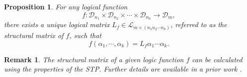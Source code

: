 \documentclass[11pt,onecolumn]{article}
\newtheorem{proposition}{Proposition}
\newtheorem{remark}{Remark}
\newcommand{\ddelta}{{\boldsymbol\delta}}
\begin{document}
	
	
	\begin{proposition}\cite{cheng2011analysis}\label{TheoremCheng} For any logical function
		\[f:\mathscr D_{n_1}\times\mathscr D_{n_2}\times\cdots\times\mathscr D_{n_k}\rightarrow\mathscr D_m,\] there exists a unique logical matrix $L_f\in\mathscr L_{m\times (n_1n_2\cdots n_k)}$, referred to as the structural matrix of $f$, such that
		\[  f(\alpha_1,\cdots,\alpha_k)=L_f \alpha_1\cdots  \alpha_k.\]

	\end{proposition}


\begin{remark}The structural matrix of a given logic function $f$ can be calculated using the properties of the STP. Further details are available in a prior work \cite{cheng2011analysis}.

\end{remark}



\end{document}
